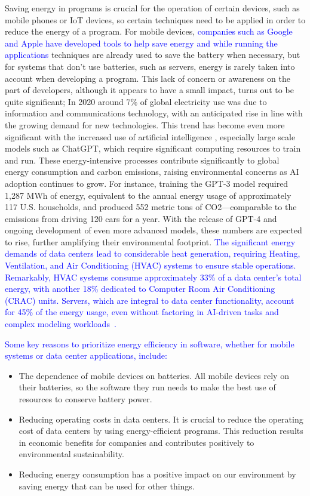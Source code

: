 \documentclass[sigplan]{acmart}
\newcommand{\wnote}[1]{\textcolor{blue}{#1}}
\begin{document}
Saving energy in programs is crucial for the operation of certain devices, such as mobile phones or IoT devices, so certain techniques need to be applied in order to reduce the energy of a program. For mobile devices, \wnote{companies such as Google and Apple have developed tools\cite{google_adaptive_battery,google_battery_saver,apple_clean_energy, android_power_profiler} to help save energy and while running the applications} techniques are already used to save the battery when necessary, but for systems that don't use batteries, such as servers, energy is rarely taken into account when developing a program. This lack of concern or awareness on the part of developers, although it appears to have a small impact, turns out to be quite significant; In 2020 around 7\% of global electricity use was due to information and communications technology, with an anticipated rise in line with the growing demand for new technologies\cite{article}. This trend has become even more significant with the increased use of artificial intelligence \cite{patterson2021carbon}, especially large scale models such as ChatGPT, which require significant computing resources to train and run. These energy-intensive processes contribute significantly to global energy consumption and carbon emissions, raising environmental concerns as AI adoption continues to grow. For instance, training the GPT-3 model required 1,287 MWh of energy, equivalent to the annual energy usage of approximately 117 U.S. households, and produced 552 metric tons of CO2—comparable to the emissions from driving 120 cars for a year. With the release of GPT-4 and ongoing development of even more advanced models, these numbers are expected to rise, further amplifying their environmental footprint. \wnote{The significant energy demands of data centers lead to considerable heat generation, requiring Heating, Ventilation, and Air Conditioning (HVAC) systems to ensure stable operations. Remarkably, HVAC systems consume approximately 33\% of a data center's total energy, with another 18\% dedicated to Computer Room Air Conditioning (CRAC) units. Servers, which are integral to data center functionality, account for 45\% of the energy usage, even without factoring in AI-driven tasks and complex modeling workloads~\cite{balaras2017high}.}

\wnote{Some key reasons to prioritize energy efficiency in software, whether for mobile systems or data center applications, include:}

\begin{itemize}
  \item The dependence of mobile devices on batteries. All mobile devices rely on their batteries, so the software they run needs to make the best use of resources to conserve battery power.
  \item Reducing operating costs in data centers. It is crucial to reduce the operating cost of data centers by using energy-efficient programs. This reduction results in economic benefits for companies and contributes positively to environmental sustainability. 
  \item Reducing energy consumption has a positive impact on our environment by saving energy that can be used for other things. 
\end{itemize}
\end{document}

